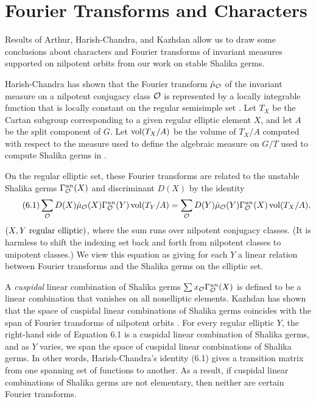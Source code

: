 \documentclass{amsart}
\begin{document}
\section{Fourier Transforms and Characters}

Results of Arthur, Harish-Chandra, and Kazhdan allow us to draw some
conclusions about characters and Fourier transforms of invariant
measures supported on nilpotent
orbits from our work on stable Shalika germs.

Harish-Chandra has shown that the Fourier transform $\hat\mu_{\mathcal O}$ of
the invariant measure on a nilpotent conjugacy class ${\mathcal O}$ is
represented by a locally integrable function
that  is locally  constant
on the regular semisimple set \cite{HC}.  
Let $T_X$ be the Cartan subgroup corresponding to a given
regular elliptic element $X$, and let $A$ be the split
component of $G$.  Let $\operatorname{vol}(T_X/A)$ be the volume
of $T_X/A$ computed with respect to the measure 
used to define the algebraic measure on $G/T$ used
to compute Shalika germs in \cite{L}.

On the regular elliptic set, these Fourier
transforms are related to the
unstable Shalika germs $\Gamma^{un}_{\mathcal O}(X)$ 
and discriminant $D(X)$ by the identity \cite{HC}
\begin{equation}\tag{6.1}
\sum_{\mathcal O} D(X)\hat\mu_{\mathcal O}(X)\Gamma^{un}_{\mathcal O}(Y)\operatorname{vol}(T_Y/A) = 
   \sum_{\mathcal O} D(Y)\hat\mu_{\mathcal O}(Y) \Gamma^{un}_{\mathcal O}(X)\operatorname{vol}(T_X/A),
\end{equation}
$(X,Y \ \hbox{regular elliptic})$,
where the sum runs over nilpotent conjugacy classes.  (It is harmless
to shift the indexing set back and forth from nilpotent classes to
unipotent classes.)  We view this equation as giving for each $Y$ a
linear relation between Fourier transforms
 and
the Shalika germs
 on the elliptic set.

A {\it cuspidal\/} linear combination of Shalika germs
$\sum x_{\mathcal O} \Gamma^{un}_{\mathcal O}(X)$ is defined to be a linear combination that
vanishes on all nonelliptic elements.  Kazhdan has shown that the
space of cuspidal linear combinations of Shalika germs coincides with
the span of Fourier transforms of nilpotent orbits \cite{K}. For every
regular elliptic $Y$, the right-hand side of Equation 6.1 is a cuspidal
linear combination of Shalika germs, and as
$Y$ varies, we span the
space of cuspidal linear combinations of Shalika germs.
In other words, Harish-Chandra's identity (6.1) gives a transition
matrix from one spanning set of functions to another.  As a result,
if cuspidal linear combinations of Shalika germs are not elementary,
then neither are certain Fourier transforms.
\end{document}
